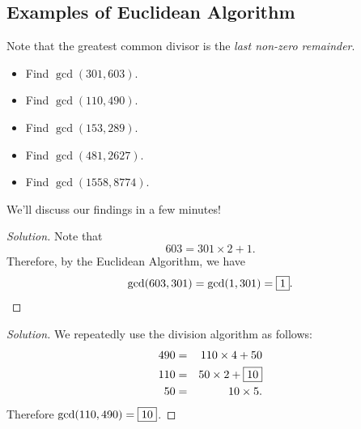 \subsection*{Examples of Euclidean Algorithm}

Note that the greatest common divisor is the \textit{last non-zero remainder}. 
\begin{itemize}
		\item Find $\gcd(301, 603)$.  
		\item  Find $\gcd(110, 490)$.
		\item  Find $\gcd(153, 289)$.
		\item  Find $\gcd(481, 2627)$. 
\end{itemize}
\begin{itemize}[label=$\star$]
		\item Find $\gcd(1558, 8774)$. 
\end{itemize} 

We'll discuss our findings in a few minutes!

\clearpage


\begin{proof}[Solution]  
Note that $$603=301\times 2+1.$$  Therefore, by the Euclidean Algorithm, we have $$\gcd(603, 301)=\gcd(1, 301)=\framebox{1}.$$ 

\end{proof}

\clearpage


\begin{proof}[Solution]
	 We repeatedly use the division algorithm as follows: 
	 \begin{eqnarray*} 490&=&110\times 4+50 \\ 110&=&50\times 2+\framebox{10} \\ 50&=&10\times 5.\end{eqnarray*} 
Therefore $\gcd(110, 490)=\framebox{10}$.  \end{proof} 

\clearpage


